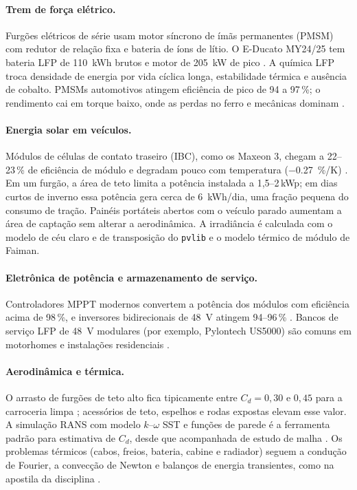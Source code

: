 \documentclass[11pt,a4paper]{article}
\begin{document}
\paragraph{Trem de força elétrico.} Furgões elétricos de série usam motor síncrono de
ímãs permanentes (PMSM) com redutor de relação fixa e bateria de íons de lítio. O
E-Ducato MY24/25 tem bateria LFP de \SI{110}{kWh} brutos e motor de \SI{205}{kW} de pico
\cite{fiatsk,fiatuk}. A química LFP troca densidade de energia por vida cíclica longa,
estabilidade térmica e ausência de cobalto. PMSMs automotivos atingem eficiência de pico
de 94 a 97\,\%; o rendimento cai em torque baixo, onde as perdas no ferro e mecânicas
dominam \cite{hendershot}.

\paragraph{Energia solar em veículos.} Módulos de células de contato traseiro (IBC), como
os Maxeon 3, chegam a 22--23\,\% de eficiência de módulo e degradam pouco com
temperatura (\SI{-0,27}{\percent/K}) \cite{maxeon}. Em um furgão, a área de teto limita a
potência instalada a 1,5--2\,kWp; em dias curtos de inverno essa potência gera cerca de
\SI{6}{kWh/dia}, uma fração pequena do consumo de tração. Painéis portáteis abertos com o
veículo parado aumentam a área de captação sem alterar a aerodinâmica. A irradiância é
calculada com o modelo de céu claro e de transposição do \texttt{pvlib} \cite{pvlib} e o
modelo térmico de módulo de Faiman.

\paragraph{Eletrônica de potência e armazenamento de serviço.} Controladores MPPT
modernos convertem a potência dos módulos com eficiência acima de 98\,\%, e inversores
bidirecionais de \SI{48}{V} atingem 94--96\,\% \cite{victron}. Bancos de serviço LFP de
\SI{48}{V} modulares (por exemplo, Pylontech US5000) são comuns em motorhomes e
instalações residenciais \cite{pylontech}.

\paragraph{Aerodinâmica e térmica.} O arrasto de furgões de teto alto fica tipicamente
entre $C_d = 0{,}30$ e $0{,}45$ para a carroceria limpa \cite{hucho}; acessórios de teto,
espelhos e rodas expostas elevam esse valor. A simulação RANS com modelo $k$--$\omega$ SST e funções de
parede é a ferramenta padrão para estimativa de $C_d$, desde que acompanhada de estudo
de malha \cite{celik}. Os problemas térmicos (cabos, freios, bateria, cabine e
radiador) seguem a condução de Fourier, a convecção de Newton e balanços de energia
transientes, como na apostila da disciplina \cite{apostila,incropera}.
\end{document}
